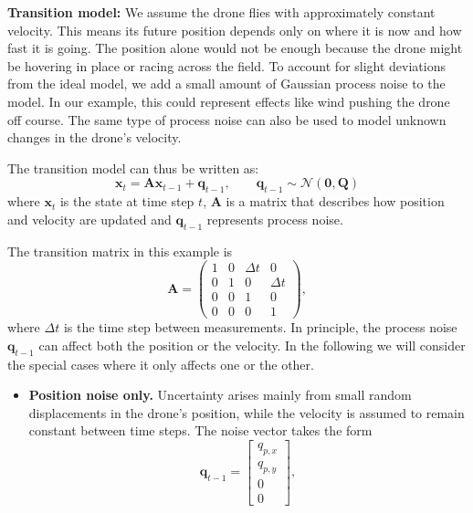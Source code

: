 \begin{example}
\textbf{Transition model:} We assume the drone flies with approximately constant velocity. This means its future position depends only on where it is now and how fast it is going. The position alone would not be enough because the drone might be hovering in place or racing across the field. To account for slight deviations from the ideal model, we add a small amount of Gaussian process noise to the model. In our example, this could represent effects like wind pushing the drone off course. The same type of process noise can also be used to model unknown changes in the drone's velocity.


The transition model can thus be written as: 
\begin{equation}\label{eq: transition model}
    \mathbf{x}_t = \mathbf{A}\mathbf{x}_{t-1}+\mathbf{q}_{t-1}, 
    \qquad 
    \mathbf{q}_{t-1} \sim \mathcal{N}(\mathbf{0}, \mathbf{Q})  
\end{equation}
where $\mathbf{x}_t$ is the state at time step $t$, $\mathbf{A}$ is a matrix that describes how position and velocity are updated and $\mathbf{q}_{t-1}$ represents process noise. 

The transition matrix in this example is
\begin{equation}\label{eq:drone transition}
\mathbf{A}=
\begin{pmatrix}
    1 & 0 & \Delta t & 0 \\
    0 & 1 & 0 & \Delta t \\
    0 & 0 & 1 & 0 \\
    0 & 0 & 0 & 1    
\end{pmatrix},
\end{equation}
where $\Delta t$ is the time step between measurements. In principle, the process noise $\mathbf{q}_{t-1}$ can affect both the position or the velocity. In the following we will consider the special cases where it only affects one or the other.

\begin{itemize}

    \item{\textbf{Position noise only.}}
    Uncertainty arises mainly from small random displacements in the drone's position, while the velocity is assumed to remain constant between time steps. The noise vector takes the form
    \[
    \mathbf{q}_{t-1} = 
    \begin{bmatrix}
        q_{p,x} \\
        q_{p,y} \\
        0 \\
        0
    \end{bmatrix},
    \]
    

\end{itemize}
\end{example}

